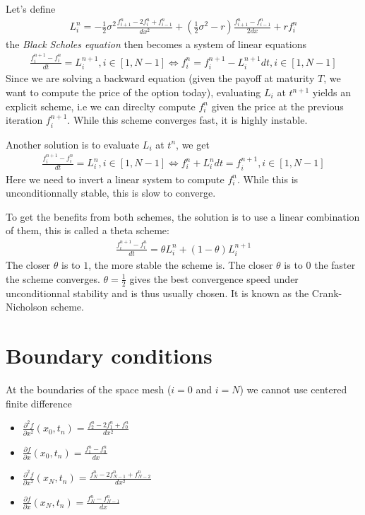 \documentclass[a4paper]{article}
\begin{document}
Let's define
\begin{gather*}L_i^n = -\frac{1}{2}\sigma^2\frac{f_{i+1}^n - 2 f_i^n + f_{i-1}^n}{dx^2} + (\frac{1}{2}\sigma^2 - r)  \frac{f_{i+1}^n - f_{i-1}^n}{2dx} + rf_i^n
\end{gather*}  the \textit{Black Scholes equation} then becomes a system of linear equations
\begin{gather*}
\frac{f_i^{n+1} - f_i^{n}}{dt} = L_i^{n+1}, i \in [1, N-1] \Longleftrightarrow
f_i^n = f_i^{n+1} - L_i^{n+1}dt, i \in [1, N-1]
\end{gather*}
Since we are solving a backward equation (given the payoff at maturity $T$, we want to compute the price of the option today), evaluating $L_i$ 
at $t^{n+1}$ yields an explicit scheme, i.e we can direclty compute $f_i^n$ given the price at the previous iteration $f_i^{n+1}$. While this scheme
converges fast, it is highly instable.

Another solution is to evaluate $L_i$ at $t^n$, we get
\begin{gather*}
\frac{f_i^{n+1} - f_i^{n}}{dt} = L_i^{n}, i \in [1, N-1] \Longleftrightarrow
f_i^n + L_i^n dt = f_i^{n+1}, i \in [1, N-1]
\end{gather*}
Here we need to invert a linear system to compute $f_i^n$. While this is unconditionnally stable, this is slow to converge.

To get the benefits from both schemes, the solution is to use a linear combination of them, this is called a theta scheme:
\begin{gather*}
\frac{f_i^{n+1} - f_i^{n}}{dt} = \theta L_i^n + (1-\theta) L_i^{n+1}
\end{gather*}
The closer $\theta$ is to $1$, the more stable the scheme is. The closer $\theta$ is to $0$ the faster the scheme converges. $\theta = \frac{1}{2}$ gives
the best convergence speed under unconditionnal stability and is thus usually chosen. It is known as the Crank-Nicholson scheme.

\section{Boundary conditions}

At the boundaries of the space mesh ($i = 0$ and $i = N$) we cannot use centered finite difference
\begin{itemize}
\item $\frac{\partial^2 f}{\partial x^2}(x_0, t_n) = \frac{f_{2}^n - 2f_{1}^n + f_{0}^n}{dx^2}$
\item $\frac{\partial f}{\partial x}(x_0, t_n) = \frac{f_{1}^n - f_{0}^n}{dx}$
\item $\frac{\partial^2 f}{\partial x^2}(x_N, t_n) = \frac{f_{N}^n - 2f_{N-1}^n + f_{N-2}^n}{dx^2}$
\item $\frac{\partial f}{\partial x}(x_N, t_n) = \frac{f_{N}^n - f_{N-1}^n}{dx}$
\end{itemize}
\end{document}

